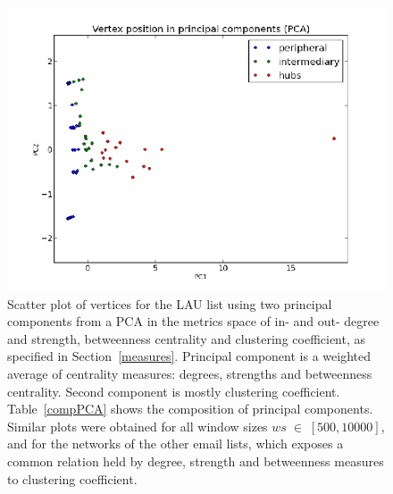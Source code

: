 \documentclass[%
 aip,
 jmp,%
 amsmath,amssymb,
 reprint,%
]{revtex4-1}
\begin{document}
\begin{figure} 
   \centering
        \includegraphics[width=\columnwidth]{figs/ev0pr3PCA}
    \caption{Scatter plot of vertices for the LAU list using two principal components from a PCA in the metrics space of in- and out- degree and strength, betweenness centrality and clustering coefficient, as specified in Section~\ref{measures}. Principal component is a weighted average of centrality measures: degrees, strengths and betweenness centrality. Second component is mostly clustering coefficient. Table~\ref{compPCA} shows the composition of principal components.  Similar plots were obtained for all window sizes  $ws\;\in\;[500,10000]$, and for the networks of the other email lists, which exposes a common relation held by degree, strength and betweenness measures to clustering coefficient.}
    \label{PCA}
\end{figure}
\end{document}
